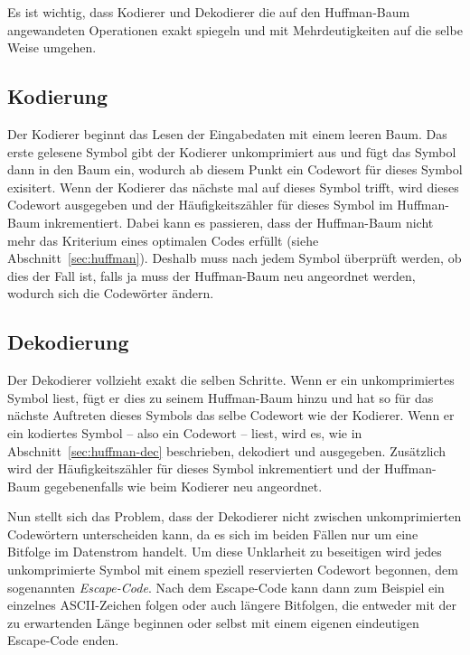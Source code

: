\documentclass[twoside,11pt,a4paper]{article}
\theoremstyle{break}
\begin{document}
Es ist wichtig, dass Kodierer und Dekodierer die auf den Huffman-Baum
angewandeten Operationen exakt spiegeln und mit Mehrdeutigkeiten auf
die selbe Weise umgehen.

\subsection{Kodierung}

Der Kodierer beginnt das Lesen der Eingabedaten mit einem leeren
Baum. Das erste gelesene Symbol gibt der Kodierer unkomprimiert aus
und fügt das Symbol dann in den Baum ein, wodurch ab diesem Punkt ein
Codewort für dieses Symbol exisitert. Wenn der Kodierer das nächste
mal auf dieses Symbol trifft, wird dieses Codewort ausgegeben und der
Häufigkeitszähler für dieses Symbol im Huffman-Baum inkrementiert.
Dabei kann es passieren, dass der Huffman-Baum nicht mehr das
Kriterium eines optimalen Codes erfüllt (siehe
Abschnitt~\ref{sec:huffman}).  Deshalb muss nach jedem Symbol
überprüft werden, ob dies der Fall ist, falls ja muss der Huffman-Baum
neu angeordnet werden, wodurch sich die Codewörter ändern.

\subsection{Dekodierung}

Der Dekodierer vollzieht exakt die selben Schritte. Wenn er ein
unkomprimiertes Symbol liest, fügt er dies zu seinem Huffman-Baum
hinzu und hat so für das nächste Auftreten dieses Symbols das selbe
Codewort wie der Kodierer. Wenn er ein kodiertes Symbol -- also ein
Codewort -- liest, wird es, wie in Abschnitt~\ref{sec:huffman-dec}
beschrieben, dekodiert und ausgegeben. Zusätzlich wird der
Häufigkeitszähler für dieses Symbol inkrementiert und der Huffman-Baum
gegebenenfalls wie beim Kodierer neu angeordnet.

Nun stellt sich das Problem, dass der Dekodierer nicht zwischen
unkomprimierten Codewörtern unterscheiden kann, da es sich im beiden
Fällen nur um eine Bitfolge im Datenstrom handelt. Um diese Unklarheit
zu beseitigen wird jedes unkomprimierte Symbol mit einem speziell
reservierten Codewort begonnen, dem sogenannten \emph{Escape-Code}.
Nach dem Escape-Code kann dann zum Beispiel ein einzelnes
ASCII-Zeichen folgen oder auch längere Bitfolgen, die entweder mit der
zu erwartenden Länge beginnen oder selbst mit einem eigenen
eindeutigen Escape-Code enden.
\end{document}
